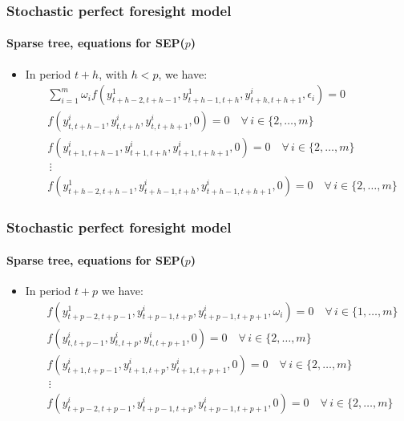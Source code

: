 \documentclass{beamer}
\begin{document}
\begin{frame}
   \frametitle{Stochastic perfect foresight model}
   \framesubtitle{Sparse tree, equations for SEP($p$)}

   \begin{itemize}

      \item In period $t+h$, with $h<p$, we have:
            \[
               \begin{split}
                   & \sum_{i=1}^m\omega_i f\left( y_{t+h-2,t+h-1}^1, y_{t+h-1,t+h}^1, y_{t+h, t+h+1}^i, \epsilon_i \right) = 0      \\
                   & f\left(y_{t,t+h-1}^i, y_{t,t+h}^i, y_{t,t+h+1}^i, 0\right) = 0\quad \forall\, i\in\{2,\ldots,m\}               \\
                   & f\left(y_{t+1,t+h-1}^i, y_{t+1,t+h}^i, y_{t+1, t+h+1}^i, 0\right) = 0\quad \forall\, i\in\{2,\ldots,m\}        \\
                   & \,\vdots                                                                                                       \\
                   & f\left(y_{t+h-2,t+h-1}^1, y_{t+h-1,t+h}^i, y_{t+h-1,t+h+1}^i, 0 \right) = 0 \quad \forall\, i\in\{2,\ldots,m\}
               \end{split}
            \]

   \end{itemize}

\end{frame}


\begin{frame}
   \frametitle{Stochastic perfect foresight model}
   \framesubtitle{Sparse tree, equations for SEP($p$)}

   \begin{itemize}

      \item In period $t+p$ we have:
            \[
               \begin{split}
                   & f\left(y_{t+p-2,t+p-1}^1, y_{t+p-1,t+p}^i, y_{t+p-1,t+p+1}^i, \omega_i\right) = 0 \quad \forall\, i\in\{1,\ldots,m\} \\
                   & f\left(y_{t,t+p-1}^i, y_{t,t+p}^i, y_{t,t+p+1}^i, 0\right) = 0 \quad \forall\, i\in\{2,\ldots,m\}                    \\
                   & f\left(y_{t+1,t+p-1}^i, y_{t+1,t+p}^i, y_{t+1, t+p+1}^i, 0\right) = 0\quad \forall\, i\in\{2,\ldots,m\}              \\
                   & \,\vdots                                                                                                             \\
                   & f\left(y_{t+p-2,t+p-1}^i, y_{t+p-1,t+p}^i, y_{t+p-1,t+p+1}^i, 0 \right) = 0 \quad \forall\, i\in\{2,\ldots,m\}
               \end{split}
            \]

   \end{itemize}

\end{frame}
\end{document}
